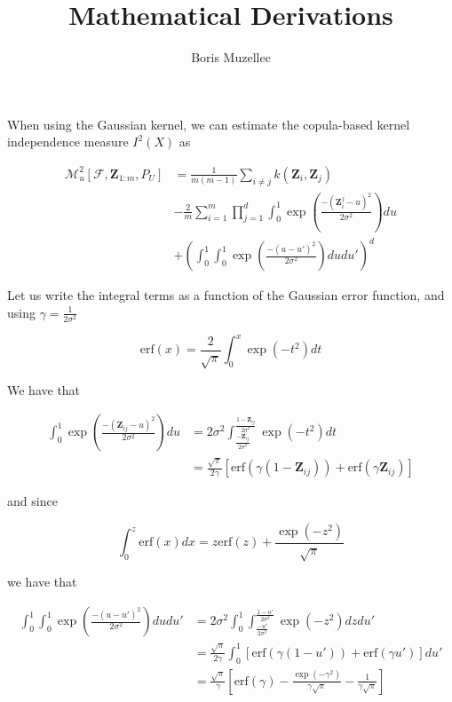 \documentclass[10pt,a4paper]{article}
\author{Boris Muzellec}
\title{Mathematical Derivations}
\begin{document}
When using the Gaussian kernel, we can estimate the copula-based kernel independence measure $I^2(X)$ as


\begin{equation}
\begin{aligned}
\mathcal{M}_u^2[\mathcal{F}, \boldsymbol{Z}_{1:m}, P_U]  &= \frac{1}{m(m-1)}\sum_{i\neq j}k(\boldsymbol{Z}_{i}, \boldsymbol{Z}_{j})\\
& - \frac{2}{m}\sum_{i=1}^{m}\prod_{j=1}^{d}\int_0^1 \exp\left(\frac{-(\boldsymbol{Z}_{i}^j - u)^2}{2\sigma^2}\right)du \\
& + \left(\int_0^1\int_0^1\exp\left(\frac{-(u-u')^2}{2\sigma^2}\right)du du'\right)^d
\end{aligned}
\end{equation}

Let us write the integral terms as a function of the Gaussian error function, and using $\gamma = \frac{1}{2\sigma^2}$

$$\mathrm{erf}(x) = \frac{2}{\sqrt{\pi}}\int_0^x \exp(-t^2)dt$$

We have that 

\begin{align}
\int_0^1\exp\left(\frac{-(\boldsymbol{Z}_{ij} - u)^2}{2\sigma^2}\right) du &= 2\sigma^2\int_{\frac{-\boldsymbol{Z}_{ij}}{2\sigma^2}}^{\frac{1-\boldsymbol{Z}_{ij}}{2\sigma^2}}\exp(-t^2) dt \\
&= \frac{\sqrt{\pi}}{2\gamma}[\mathrm{erf}(\gamma(1 - \boldsymbol{Z}_{ij})) + \mathrm{erf}(\gamma\boldsymbol{Z}_{ij})]
\end{align}

and since

\begin{equation}
\int_0^z \mathrm{erf}(x)dx = z\mathrm{erf}(z) + \frac{\exp(-z^2)}{\sqrt{\pi}}
\end{equation}

we have that

\begin{align}
\int_0^1\int_0^1 \exp\left(\frac{-(u-u')^2}{2\sigma^2}\right)du du' &= 2\sigma^2 \int_0^1\int_{\frac{-u'}{2\sigma^2}}^{\frac{1-u'}{2\sigma^2}}\exp(-z^2)dzdu'\\
&= \frac{\sqrt{\pi}}{2\gamma} \int_0^1 \left[\mathrm{erf}(\gamma(1-u')) + \mathrm{erf}(\gamma u')\right]du' \\
&= \frac{\sqrt{\pi}}{\gamma}\left[\mathrm{erf}(\gamma) - \frac{\exp(-\gamma^2)}{\gamma\sqrt{\pi}} - \frac{1}{\gamma\sqrt{\pi}}\right]
\end{align}
\end{document}
